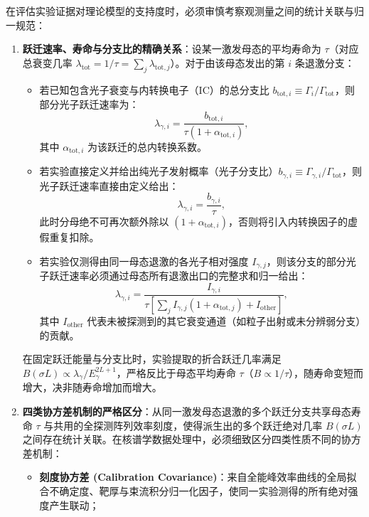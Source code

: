 在评估实验证据对理论模型的支持度时，必须审慎考察观测量之间的统计关联与归一规范：
\begin{enumerate}
\item \textbf{跃迁速率、寿命与分支比的精确关系}：设某一激发母态的平均寿命为 $\tau$（对应总衰变几率 $\lambda_{\mathrm{tot}} = 1/\tau = \sum_j \lambda_{\mathrm{tot}, j}$）。对于由该母态发出的第 $i$ 条退激分支：
\begin{itemize}
\item 若已知包含光子衰变与内转换电子（IC）的总分支比 $b_{\mathrm{tot}, i} \equiv \Gamma_i / \Gamma_{\mathrm{tot}}$，则部分光子跃迁速率为：
\begin{equation}\label{eq:3-8-b-rate-relation}
\lambda_{\gamma, i} = \frac{b_{\mathrm{tot}, i}}{\tau (1 + \alpha_{\mathrm{tot}, i})} ,
\end{equation}
其中 $\alpha_{\mathrm{tot}, i}$ 为该跃迁的总内转换系数。
\item 若实验直接定义并给出纯光子发射概率（光子分支比）$b_{\gamma, i} \equiv \Gamma_{\gamma, i} / \Gamma_{\mathrm{tot}}$，则光子跃迁速率直接由定义给出：
\begin{equation}\label{eq:3-8-b-rate-direct}
\lambda_{\gamma, i} = \frac{b_{\gamma, i}}{\tau} ,
\end{equation}
此时分母绝不可再次额外除以 $(1 + \alpha_{\mathrm{tot}, i})$，否则将引入内转换因子的虚假重复扣除。
\item 若实验仅测得由同一母态退激的各光子相对强度 $I_{\gamma, j}$，则该分支的部分光子跃迁速率必须通过母态所有退激出口的完整求和归一给出：
\begin{equation}\label{eq:3-8-lambda-relative}
\lambda_{\gamma, i} = \frac{I_{\gamma, i}}{\tau \left[ \sum_j I_{\gamma, j} (1 + \alpha_{\mathrm{tot}, j}) + I_{\mathrm{other}} \right]} ,
\end{equation}
其中 $I_{\mathrm{other}}$ 代表未被探测到的其它衰变通道（如粒子出射或未分辨弱分支）的贡献。
\end{itemize}
在固定跃迁能量与分支比时，实验提取的折合跃迁几率满足 $B(\sigma L) \propto \lambda_\gamma / E_\gamma^{2L+1}$，严格反比于母态平均寿命 $\tau$（$B \propto 1/\tau$），随寿命变短而增大，决非随寿命增加而增大。
\item \textbf{四类协方差机制的严格区分}：从同一激发母态退激的多个跃迁分支共享母态寿命 $\tau$ 与共用的全探测阵列效率刻度，使得派生出的多个跃迁绝对几率 $B(\sigma L)$ 之间存在统计关联。在核谱学数据处理中，必须细致区分四类性质不同的协方差机制：
\begin{itemize}
\item \textbf{刻度协方差 (Calibration Covariance)}：来自全能峰效率曲线的全局拟合不确定度、靶厚与束流积分归一化因子，使同一实验测得的所有绝对强度产生联动；

\end{itemize}
\end{enumerate}
